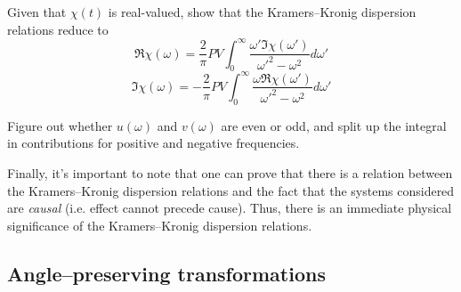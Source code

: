 \begin{exer}
Given that $\chi(t)$ is real-valued, show that the Kramers--Kronig dispersion relations reduce to
$$\Re \chi(\omega) =  \frac{2}{\pi} PV \int_{0}^{\infty}{ \frac{\omega'\Im \chi(\omega')}{\omega'^2-\omega^2}d\omega'}$$
$$\Im \chi(\omega) = -\frac{2}{\pi} PV \int_{0}^{\infty}{ \frac{\omega \Re \chi(\omega')}{\omega'^2-\omega^2}d\omega'}$$

  \begin{hnt}
    Figure out whether $u(\omega)$ and $v(\omega)$ are even or odd, and split up the integral in contributions for positive and negative frequencies.
  \end{hnt}
\end{exer}

Finally, it's important to note that one can prove that there is a relation between the Kramers--Kronig dispersion relations and the fact that the systems considered are \emph{causal} (i.e. effect cannot precede cause)\noindent{}. Thus, there is an immediate physical significance of the Kramers--Kronig dispersion relations.


\pagebreak


\label{week3}

\subsection*{Angle--preserving transformations}


